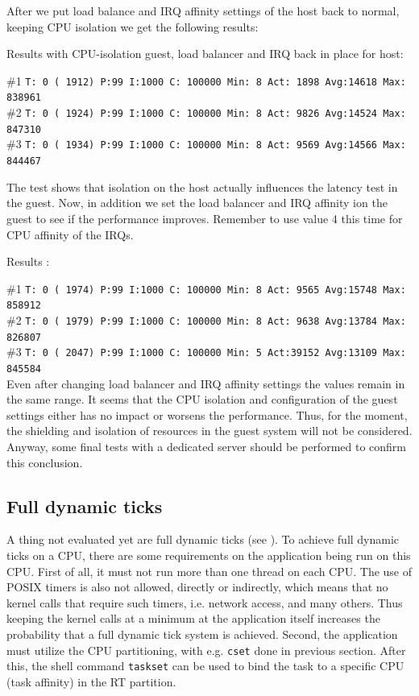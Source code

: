 \documentclass[]{scrartcl}
\begin{document}
After we put load balance and IRQ affinity settings of the host back to normal, keeping CPU isolation we get the following results:

\bigskip

\noindent Results with CPU-isolation guest, load balancer and IRQ back in place for host:

\noindent \#1 \small \texttt{T: 0 ( 1912) P:99 I:1000 C: 100000 Min:      8 Act: 1898 Avg:14618 Max:  838961}\\
\noindent \#2 \small \texttt{T: 0 ( 1924) P:99 I:1000 C: 100000 Min:      8 Act: 9826 Avg:14524 Max:  847310}\\
\noindent \#3 \small \texttt{T: 0 ( 1934) P:99 I:1000 C: 100000 Min:      8 Act: 9569 Avg:14566 Max:  844467}

The test shows that isolation on the host actually influences the latency test in the guest.
Now, in addition we set the load balancer and IRQ affinity ion the guest to see if the performance improves. Remember to use value 4 this time for CPU affinity of the IRQs.
\bigskip

\noindent Results :

\noindent \#1 \small \texttt{T: 0 ( 1974) P:99 I:1000 C: 100000 Min:      8 Act: 9565 Avg:15748 Max:  858912}\\
\noindent \#2 \small \texttt{T: 0 ( 1979) P:99 I:1000 C: 100000 Min:      8 Act: 9638 Avg:13784 Max:  826807}\\
\noindent \#3 \small \texttt{T: 0 ( 2047) P:99 I:1000 C: 100000 Min:      5 Act:39152 Avg:13109 Max:  845584}\\

Even after changing load balancer and IRQ affinity settings the values remain in the same range. It seems that the CPU isolation and configuration of the guest settings either has no impact or worsens the performance.
Thus, for the moment, the shielding and isolation of resources in the guest system will not be considered. 
Anyway, some final tests with a dedicated server should be performed to confirm this conclusion.

\subsection{Full dynamic ticks}

A thing not evaluated yet are full dynamic ticks (see \cite{lrt02}). To achieve full dynamic ticks on a CPU, there are some requirements on the application being run on this CPU. First of all, it must not run more than one thread on each CPU. The use of POSIX timers is also not allowed, directly or indirectly, which means that no kernel calls that require such timers, i.e. network access, and many others. Thus keeping the kernel calls at a minimum at the application itself increases the probability that a full dynamic tick system is achieved.
Second, the application must utilize the CPU partitioning, with e.g. \texttt{cset} done in previous section. After this, the shell command \texttt{taskset} can be used to bind the task to a specific CPU (task affinity) in the RT partition.
\end{document}
